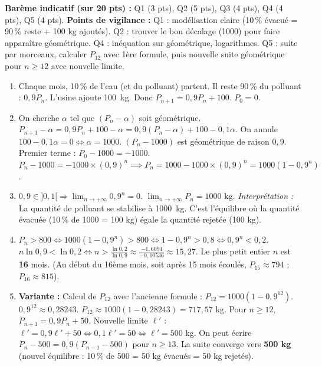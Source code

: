 \documentclass[11pt]{article}
\begin{document}
\begin{corrige}
\textbf{Barème indicatif (sur 20 pts) :} Q1 (3 pts), Q2 (5 pts), Q3 (4 pts), Q4 (4 pts), Q5 (4 pts).
\textbf{Points de vigilance :} Q1 : modélisation claire (10\,\% évacué = 90\,\% reste + 100 kg ajoutés). Q2 : trouver le bon décalage (1000) pour faire apparaître géométrique. Q4 : inéquation sur géométrique, logarithmes. Q5 : suite par morceaux, calculer $P_{12}$ avec 1ère formule, puis nouvelle suite géométrique pour $n\ge 12$ avec nouvelle limite.
\begin{enumerate}
    \item Chaque mois, 10\,\% de l'eau (et du polluant) partent. Il reste 90\,\% du polluant : $0,9 P_n$.
    L'usine ajoute \SI{100}{kg}.
    Donc $P_{n+1} = 0,9 P_n + 100$. $P_0 = 0$.
    \item On cherche $\alpha$ tel que $(P_n - \alpha)$ soit géométrique.
    $P_{n+1} - \alpha = 0,9 P_n + 100 - \alpha = 0,9(P_n - \alpha) + 100 - 0,1\alpha$.
    On annule $100 - 0,1\alpha = 0 \iff \alpha = 1000$.
    $(P_n - 1000)$ est géométrique de raison $0,9$.
    Premier terme : $P_0 - 1000 = -1000$.
    $P_n - 1000 = -1000 \times (0,9)^n \implies P_n = 1000 - 1000 \times (0,9)^n = 1000(1 - 0,9^n)$.
    \item $0,9 \in ]0,1[ \Rightarrow \lim_{n\to+\infty} 0,9^n = 0$.
    $\lim_{n\to+\infty} P_n = 1000$ kg.
    \emph{Interprétation :} La quantité de polluant se stabilise à \SI{1000}{kg}. C'est l'équilibre où la quantité évacuée (10\,\% de 1000 = 100 kg) égale la quantité rejetée (100 kg).
    \item $P_n > 800 \iff 1000(1 - 0,9^n) > 800 \iff 1 - 0,9^n > 0,8 \iff 0,9^n < 0,2$.
    $n \ln 0,9 < \ln 0,2 \iff n > \frac{\ln 0,2}{\ln 0,9} \approx \frac{-1,6094}{-0,10536} \approx 15,27$.
    Le plus petit entier $n$ est \textbf{16} mois.
    (Au début du 16ème mois, soit après 15 mois écoulés, $P_{15} \approx 794$ ; $P_{16} \approx 815$).
    \item \textbf{Variante :}
    Calcul de $P_{12}$ avec l'ancienne formule : $P_{12} = 1000(1 - 0,9^{12})$.
    $0,9^{12} \approx 0,28243$. $P_{12} \approx 1000(1 - 0,28243) = 717,57$ kg.
    Pour $n \ge 12$, $P_{n+1} = 0,9 P_n + 50$.
    Nouvelle limite $\ell'$ : $\ell' = 0,9\ell' + 50 \iff 0,1\ell' = 50 \iff \ell' = 500$ kg.
    On peut écrire $P_n - 500 = 0,9(P_{n-1} - 500)$ pour $n \ge 13$.
    La suite converge vers \textbf{500 kg} (nouvel équilibre : 10\,\% de 500 = 50 kg évacués = 50 kg rejetés).
\end{enumerate}
\end{corrige}
\end{document}
